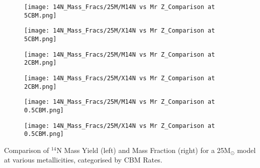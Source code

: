 \begin{minipage}{\textwidth}
	\centering
	\begin{subfigure}{0.49\textwidth}
		\texttt{[image: 14N\_Mass\_Fracs/25M/M14N vs Mr Z\_Comparison at 5CBM.png]}
	\end{subfigure}
        \hfill
	\begin{subfigure}{0.49\textwidth}
		\texttt{[image: 14N\_Mass\_Fracs/25M/X14N vs Mr Z\_Comparison at 5CBM.png]}
	\end{subfigure}
        \label{fig:14N_25M_5CBM}
\end{minipage}
\begin{minipage}{\textwidth}
	\centering
	\begin{subfigure}{0.49\textwidth}
		\texttt{[image: 14N\_Mass\_Fracs/25M/M14N vs Mr Z\_Comparison at 2CBM.png]}
	\end{subfigure}
        \hfill
	\begin{subfigure}{0.49\textwidth}
		\texttt{[image: 14N\_Mass\_Fracs/25M/X14N vs Mr Z\_Comparison at 2CBM.png]}
	\end{subfigure}
        \label{fig:14N_25M_2CBM}
\end{minipage}
\begin{minipage}{\textwidth}
	\centering
	\begin{subfigure}{0.49\textwidth}
		\texttt{[image: 14N\_Mass\_Fracs/25M/M14N vs Mr Z\_Comparison at 0.5CBM.png]}
	\end{subfigure}
        \hfill
	\begin{subfigure}{0.49\textwidth}
		\texttt{[image: 14N\_Mass\_Fracs/25M/X14N vs Mr Z\_Comparison at 0.5CBM.png]}
	\end{subfigure}
	 \caption{Comparison of $^{14}$N Mass Yield (left) and Mass Fraction (right) for a 25M$_\odot$ model at various metallicities, categorised by CBM Rates.}
        \label{fig:14N_25M_0.5CBM}
\end{minipage}


